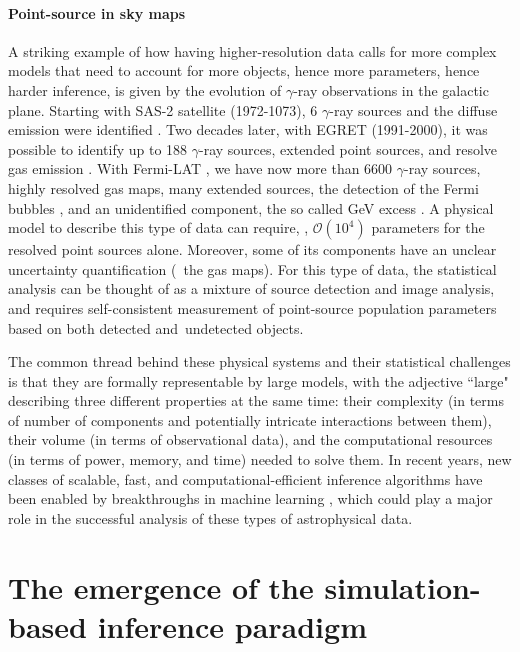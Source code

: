 \paragraph{Point-source in sky maps} 
A striking example of how having higher-resolution data calls for more complex models that need to account for more objects, hence more parameters, hence harder inference, is given by the evolution of $\gamma$-ray observations in the galactic plane. Starting with SAS-2 satellite (1972-1073), 6 $\gamma$-ray sources and the diffuse emission were identified \cite{Sas26ps, sas2}. Two decades later, with EGRET (1991-2000), it was possible to identify up to 188 $\gamma$-ray sources, extended point sources, and resolve gas emission \cite{Casandjian:2008ky}. With Fermi-LAT \cite{Fermi-LAT:2022byn}, we have now more than 6600  $\gamma$-ray sources, highly resolved gas maps, many extended sources, the detection of the Fermi bubbles \cite{dobler2010fermi}, and an unidentified component, the so called GeV excess \cite{Goodenough:2009gk}. A physical model to describe this type of data can require, \eg, $\mathcal{O}(10^4)$ parameters for the resolved point sources alone. Moreover, some of its components have an unclear uncertainty quantification (\eg\ the gas maps). For this type of data, the statistical analysis can be thought of as a mixture of source detection and image analysis, and requires self-consistent measurement of point-source population parameters based on both detected and undetected objects.
          
The common thread behind these physical systems and their statistical challenges is that they are formally representable by large models, with the adjective ``large" describing three different properties at the same time: their complexity (in terms of number of components and potentially intricate interactions between them), their volume (in terms of observational data), and the computational resources (in terms of power, memory, and time) needed to solve them. In recent years, new classes of scalable, fast, and computational-efficient inference algorithms have been enabled by breakthroughs in machine learning \cite{Murphy:book}, which could play a major role in the successful analysis of these types of astrophysical data.


\section{The emergence of the simulation-based inference paradigm} \label{sec:paradigm}

